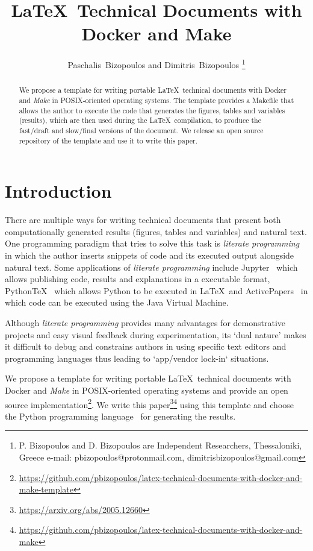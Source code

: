 \documentclass[journal]{IEEEtran}
\begin{document}

\title{\LaTeX\ Technical Documents with Docker and Make}

\author{Paschalis~Bizopoulos and Dimitris~Bizopoulos
\thanks{P. Bizopoulos and D. Bizopoulos are Independent Researchers, Thessaloniki, Greece e-mail: pbizopoulos@protonmail.com, dimitrisbizopoulos@gmail.com}}

\maketitle

\begin{abstract}
	We propose a template for writing portable \LaTeX\ technical documents with Docker and \textit{Make} in POSIX-oriented operating systems.
	The template provides a Makefile that allows the author to execute the code that generates the figures, tables and variables (results), which are then used during the \LaTeX\ compilation, to produce the fast/draft and slow/final versions of the document.
	We release an open source repository of the template and use it to write this paper.
\end{abstract}

\section{Introduction}
There are multiple ways for writing technical documents that present both computationally generated results (figures, tables and variables) and natural text.
One programming paradigm that tries to solve this task is \textit{literate programming}~\cite{knuth1984literate} in which the author inserts snippets of code and its executed output alongside natural text.
Some applications of \textit{literate programming} include Jupyter~\cite{kluyver2016jupyter} which allows publishing code, results and explanations in a executable format, PythonTeX~\cite{poore2015pythontex} which allows Python to be executed in \LaTeX\ and ActivePapers~\cite{hinsen2014activepapers} in which code can be executed using the Java Virtual Machine.

Although \textit{literate programming} provides many advantages for demonstrative projects and easy visual feedback during experimentation, its `dual nature' makes it difficult to debug and constrains authors in using specific text editors and programming languages thus leading to `app/vendor lock-in` situations.

We propose a template for writing portable \LaTeX\ technical documents with Docker and \textit{Make} in POSIX-oriented operating systems and provide an open source implementation\footnote{\url{https://github.com/pbizopoulos/latex-technical-documents-with-docker-and-make-template}}.
We write this paper\footnote{\url{https://arxiv.org/abs/2005.12660}}\footnote{\url{https://github.com/pbizopoulos/latex-technical-documents-with-docker-and-make}} using this template and choose the Python programming language~\cite{van2007python} for generating the results.
\end{document}
